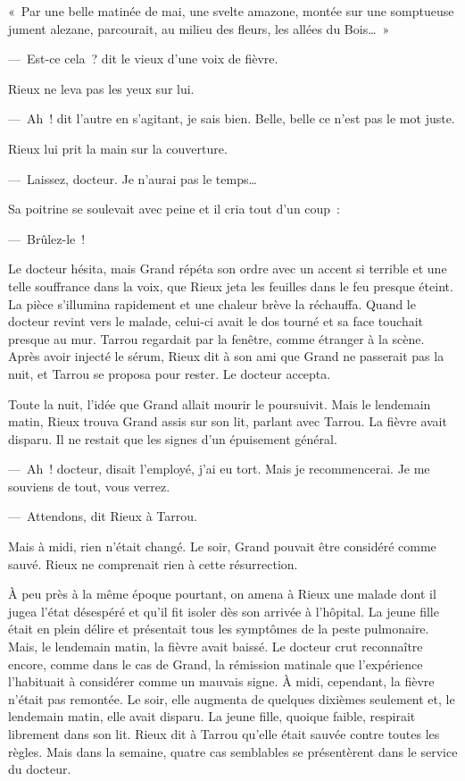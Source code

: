 \documentclass[french,twoside]{book} %
\begin{document}
« Par une belle matinée de mai, une svelte amazone, montée sur une somptueuse jument alezane, parcourait, au milieu des fleurs, les allées du Bois… »\par
— Est-ce cela ? dit le vieux d’une voix de fièvre.\par
Rieux ne leva pas les yeux sur lui.\par
— Ah ! dit l’autre en s’agitant, je sais bien. Belle, belle ce n’est pas le mot juste.\par
Rieux lui prit la main sur la couverture.\par
— Laissez, docteur. Je n’aurai pas le temps…\par
Sa poitrine se soulevait avec peine et il cria tout d’un coup :\par
— Brûlez-le !\par
Le docteur hésita, mais Grand répéta son ordre avec un accent si terrible et une telle souffrance dans la voix, que Rieux jeta les feuilles dans le feu presque éteint. La pièce s’illumina rapidement et une chaleur brève la réchauffa. Quand le docteur revint vers le malade, celui-ci avait le dos tourné et sa face touchait presque au mur. Tarrou regardait par la fenêtre, comme étranger à la scène. Après avoir injecté le sérum, Rieux dit à son ami que Grand ne passerait pas la nuit, et Tarrou se proposa pour rester. Le docteur accepta.\par
Toute la nuit, l’idée que Grand allait mourir le poursuivit. Mais le lendemain matin, Rieux trouva Grand assis sur son lit, parlant avec Tarrou. La fièvre avait disparu. Il ne restait que les signes d’un épuisement général.\par
— Ah ! docteur, disait l’employé, j’ai eu tort. Mais je recommencerai. Je me souviens de tout, vous verrez.\par
— Attendons, dit Rieux à Tarrou.\par
Mais à midi, rien n’était changé. Le soir, Grand pouvait être considéré comme sauvé. Rieux ne comprenait rien à cette résurrection.\par
À peu près à la même époque pourtant, on amena à Rieux une malade dont il jugea l’état désespéré et qu’il fit isoler dès son arrivée à l’hôpital. La jeune fille était en plein délire et présentait tous les symptômes de la peste pulmonaire. Mais, le lendemain matin, la fièvre avait baissé. Le docteur crut reconnaître encore, comme dans le cas de Grand, la rémission matinale que l’expérience l’habituait à considérer comme un mauvais signe. À midi, cependant, la fièvre n’était pas remontée. Le soir, elle augmenta de quelques dixièmes seulement et, le lendemain matin, elle avait disparu. La jeune fille, quoique faible, respirait librement dans son lit. Rieux dit à Tarrou qu’elle était sauvée contre toutes les règles. Mais dans la semaine, quatre cas semblables se présentèrent dans le service du docteur.\par
\end{document}
